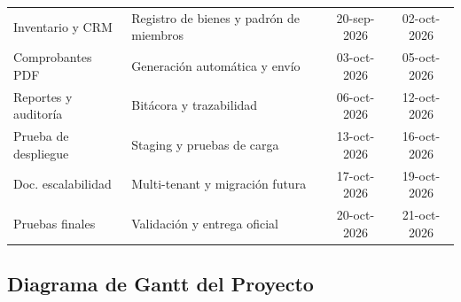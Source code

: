 \documentclass[11pt,a4paper]{article}
\begin{document}
\begin{table}[h!]
\begin{tabularx}{\textwidth}{l X c c}
			\quad Inventario y CRM & Registro de bienes y padrón de miembros & 20-sep-2026 & 02-oct-2026 \\
			\quad Comprobantes PDF & Generación automática y envío & 03-oct-2026 & 05-oct-2026 \\
			\quad Reportes y auditoría & Bitácora y trazabilidad & 06-oct-2026 & 12-oct-2026 \\
			\quad Prueba de despliegue & Staging y pruebas de carga & 13-oct-2026 & 16-oct-2026 \\
			\quad Doc. escalabilidad & Multi-tenant y migración futura & 17-oct-2026 & 19-oct-2026 \\
			\quad Pruebas finales & Validación y entrega oficial & 20-oct-2026 & 21-oct-2026 \\
			\bottomrule
		\end{tabularx}
	\end{table}
	
	
	\subsection{Diagrama de Gantt del Proyecto}
	
\end{document}

